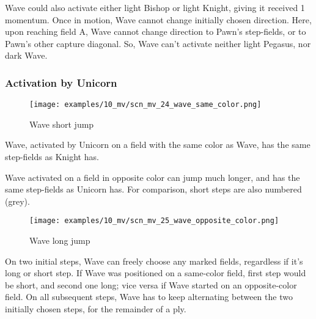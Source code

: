 Wave could also activate either light Bishop or light Knight, giving it received 1 momentum.
Once in motion, Wave cannot change initially chosen direction. Here, upon reaching field A,
Wave cannot change direction to Pawn's step-fields, or to Pawn's other capture diagonal. So,
Wave can't activate neither light Pegasus, nor dark Wave.

\clearpage %

\subsubsection*{Activation by Unicorn}

\vspace*{-0.7\baselineskip}
\noindent
\begin{wrapfigure}[10]{l}{0.45\textwidth}
\centering
\texttt{[image: examples/10\_mv/scn\_mv\_24\_wave\_same\_color.png]}
\vspace*{-0.3\baselineskip}
\caption{Wave short jump}
\label{fig:scn_mv_24_wave_same_color}
\end{wrapfigure}
Wave, activated by Unicorn on a field with the same color as Wave, has the same step-fields
as Knight has.

Wave activated on a field in opposite color can jump much longer, and has the same step-fields
as Unicorn has. For comparison, short steps are also numbered (grey).

\vspace*{0.7\baselineskip}
\noindent
\begin{wrapfigure}[18]{l}{0.7\textwidth}
\centering
\texttt{[image: examples/10\_mv/scn\_mv\_25\_wave\_opposite\_color.png]}
\vspace*{-0.3\baselineskip}
\caption{Wave long jump}
\label{fig:scn_mv_25_wave_opposite_color}
\end{wrapfigure}
On two initial steps, Wave can freely choose any marked fields, regardless if it's long or short step.
If Wave was positioned on a same-color field, first step would be short, and second one long; vice versa
if Wave started on an opposite-color field. On all subsequent steps, Wave has to keep alternating between
the two initially chosen steps, for the remainder of a ply.

